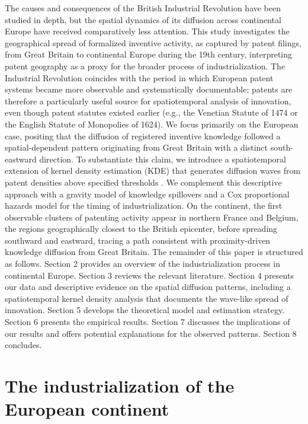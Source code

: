 \documentclass[letterpaper,12pt,leqno]{article}
\begin{document}
The causes and consequences of the British Industrial Revolution have been studied in depth, but the spatial dynamics of its diffusion across continental Europe have received comparatively less attention. This study investigates the geographical spread of formalized inventive activity, as captured by patent filings, from Great Britain to continental Europe during the 19th century, interpreting patent geography as a proxy for the broader process of industrialization.
The Industrial Revolution coincides with the period in which European patent systems became more observable and systematically documentable; patents are therefore a particularly useful source for spatiotemporal analysis of innovation, even though patent statutes existed earlier (e.g., the Venetian Statute of 1474 or the English Statute of Monopolies of 1624).
We focus primarily on the European case, positing that the diffusion of registered inventive knowledge followed a spatial-dependent pattern originating from Great Britain with a distinct south-eastward direction. To substantiate this claim, we introduce a spatiotemporal extension of kernel density estimation (KDE) that generates diffusion waves from patent densities above specified thresholds \citep[building on the tradition of using patents as innovation proxies; see][]{sokoloff1988inventive, moser2005patent}. We complement this descriptive approach with a gravity model of knowledge spillovers and a Cox proportional hazards model for the timing of industrialization.
On the continent, the first observable clusters of patenting activity appear in northern France and Belgium, the regions geographically closest to the British epicenter, before spreading southward and eastward, tracing a path consistent with proximity-driven knowledge diffusion from Great Britain.
The remainder of this paper is structured as follows. Section 2 provides an overview of the industrialization process in continental Europe. Section 3 reviews the relevant literature. Section 4 presents our data and descriptive evidence on the spatial diffusion patterns, including a spatiotemporal kernel density analysis that documents the wave-like spread of innovation. Section 5 develops the theoretical model and estimation strategy. Section 6 presents the empirical results. Section 7 discusses the implications of our results and offers potential explanations for the observed patterns. Section 8 concludes.

\section{The industrialization of the European continent}
\end{document}
